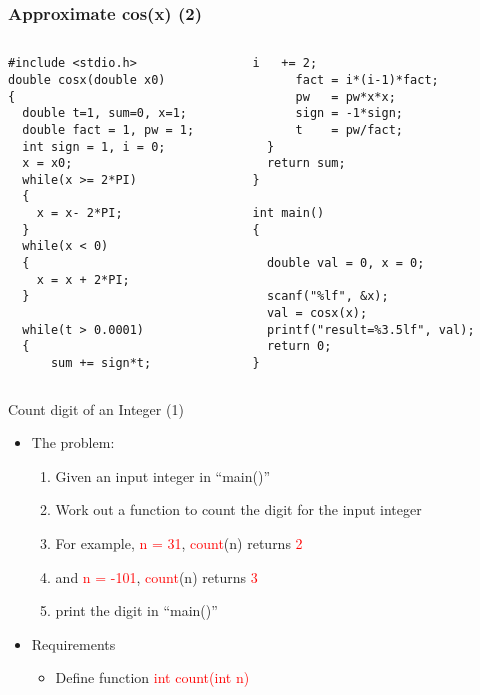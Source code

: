 \ifx\answer\undefined
\begin{frame}[fragile]
\frametitle{Approximate cos(x) (2)}
\vspace{-0.27in}
\begin{columns}
\begin{column}{0.44\linewidth}
\begin{lstlisting}
#include <stdio.h>
double cosx(double x0)
{
  double t=1, sum=0, x=1;
  double fact = 1, pw = 1;
  int sign = 1, i = 0;
  x = x0;
  while(x >= 2*PI)
  {
    x = x- 2*PI;
  }
  while(x < 0)
  {
    x = x + 2*PI;
  }

  while(t > 0.0001)
  {
      sum += sign*t;
\end{lstlisting}
\end{column}
\begin{column}{0.53\linewidth}
\begin{lstlisting}[firstnumber=20]
      i   += 2;
      fact = i*(i-1)*fact;
      pw   = pw*x*x;
      sign = -1*sign;
      t    = pw/fact;
  }
  return sum;
}

int main()
{

  double val = 0, x = 0;

  scanf("%lf", &x);
  val = cosx(x);
  printf("result=%3.5lf", val);
  return 0;
}

\end{lstlisting}
\end{column}
\end{columns}
\end{frame}
\fi

\begin{frame}{Count digit of an Integer (1)}

\begin{itemize}
	\item {The problem:}
	\begin{enumerate}
		\item {Given an input integer in ``main()''}
		\item {Work out a function to count the digit for the input integer}
		\item {For example, \textcolor{red}{n = 31}, \textcolor{red}{count}(n) returns \textcolor{red}{2}}
		\item {and \textcolor{red}{n = -101}, \textcolor{red}{count}(n) returns \textcolor{red}{3}}
		\item {print the digit in ``main()''}
	\end{enumerate}
\end{itemize}
\begin{itemize}
	\item {Requirements}
	\begin{itemize}
		\item {Define function \textcolor{red}{int count(int n)}}
	\end{itemize}
\end{itemize}
\end{frame}

